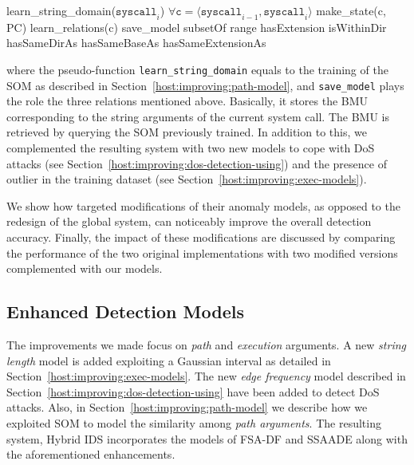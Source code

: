 \begin{pseudo}
  learn_string_domain($\mathtt{syscall}_{i}$)
  $\forall \mathtt{c} = \langle \mathtt{syscall}_{i-1}, \mathtt{syscall}_{i} \rangle$
  make_state(c, PC)
  learn_relations(c)
    save_model
    subsetOf
    range
    hasExtension
    isWithinDir
    hasSameDirAs
    hasSameBaseAs
    hasSameExtensionAs
\end{pseudo}

where the pseudo-function \texttt{learn\_string\_domain} equals to the training of the \ac{SOM} as described in Section~\ref{host:improving:path-model}, and \texttt{save\_model} plays the role the three relations mentioned above. Basically, it stores the \ac{BMU} corresponding to the string arguments of the current system call. The \ac{BMU} is retrieved by querying the \ac{SOM} previously trained. In addition to this, we complemented the resulting system with two new models to cope with \ac{DoS} attacks (see Section~\ref{host:improving:dos-detection-using}) and the presence of outlier in the training dataset (see Section~\ref{host:improving:exec-models}).

We show how targeted modifications of their anomaly models, as opposed to the redesign of the global system, can noticeably improve the overall detection accuracy. Finally, the impact of these modifications are discussed by comparing the performance of the two original implementations with two modified versions complemented with our models.

\subsection{Enhanced Detection Models}
\label{host:improving:improved-models}
The improvements we made focus on \emph{path} and \emph{execution} arguments. A new \emph{string length} model is added exploiting a Gaussian interval as detailed in Section~\ref{host:improving:exec-models}. The new \emph{edge frequency} model described in Section~\ref{host:improving:dos-detection-using} have been added to detect \ac{DoS} attacks. Also, in Section~\ref{host:improving:path-model} we describe how we exploited \ac{SOM} to model the similarity among \emph{path arguments}. The resulting system, Hybrid IDS incorporates the models of FSA-DF and \ac{SSAADE} along with the aforementioned enhancements.

